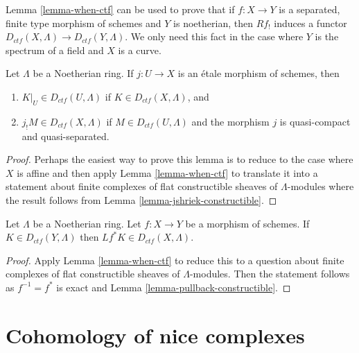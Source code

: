 \begin{remark}
\label{remark-how-used}
Lemma \ref{lemma-when-ctf}
can be used to prove that if $f: X \to Y$ is a separated, finite type
morphism of schemes and $Y$ is noetherian, then $Rf_!$ induces a functor
$D_{ctf}(X, \Lambda) \to D_{ctf}(Y, \Lambda)$. We only need this fact in
the case where $Y$ is the spectrum of a field and $X$ is a curve.
\end{remark}

\begin{lemma}
\label{lemma-restrict-and-shriek-from-etale-ctf}
Let $\Lambda$ be a Noetherian ring.
If $j : U \to X$ is an \'etale morphism of schemes, then
\begin{enumerate}
\item $K|_U \in D_{ctf}(U, \Lambda)$ if $K \in D_{ctf}(X, \Lambda)$, and
\item $j_!M \in D_{ctf}(X, \Lambda)$ if $M \in D_{ctf}(U, \Lambda)$ and
the morphism $j$ is quasi-compact and quasi-separated.
\end{enumerate}
\end{lemma}

\begin{proof}
Perhaps the easiest way to prove this lemma is to reduce to the
case where $X$ is affine and then apply Lemma \ref{lemma-when-ctf}
to translate it into a statement about finite complexes
of flat constructible sheaves of $\Lambda$-modules
where the result follows from
Lemma \ref{lemma-jshriek-constructible}.
\end{proof}

\begin{lemma}
\label{lemma-pullback-ctf}
Let $\Lambda$ be a Noetherian ring.
Let $f : X \to Y$ be a morphism of schemes. If $K \in D_{ctf}(Y, \Lambda)$
then $Lf^*K \in D_{ctf}(X, \Lambda)$.
\end{lemma}

\begin{proof}
Apply Lemma \ref{lemma-when-ctf} to reduce this to a question
about finite complexes of flat constructible sheaves of $\Lambda$-modules.
Then the statement follows as $f^{-1} = f^*$ is exact and
Lemma \ref{lemma-pullback-constructible}.
\end{proof}








\section{Cohomology of nice complexes}
\label{section-cohomology-ctf}

